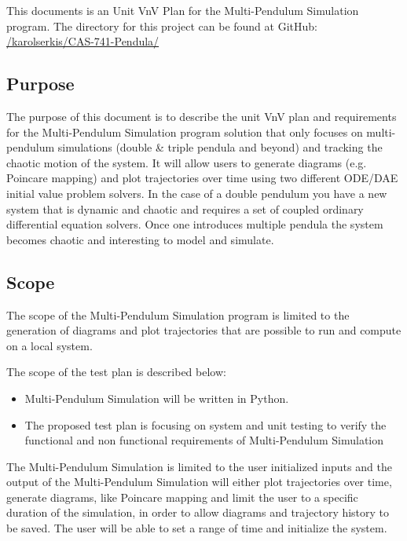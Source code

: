 \documentclass[12pt, titlepage]{article}
\newcommand{\progname}{Multi-Pendulum Simulation }
\begin{document}
This documents is an Unit VnV Plan for the \progname program. The
directory for this project can be found at GitHub:
\href{https://github.com/karolserkis/CAS-741-Pendula/}{/karolserkis/CAS-741-Pendula/}\\

\subsection{Purpose}

The purpose of this document is to describe the unit VnV plan and requirements for the
\progname program solution that
only focuses on multi-pendulum simulations (double \& triple pendula and beyond) and tracking the chaotic
motion of the system. It will allow users to generate diagrams (e.g. Poincare
mapping)
and plot trajectories over time using two different ODE/DAE initial value
problem solvers. In the case of
a double pendulum you have a new system that is dynamic and chaotic and
requires a set of coupled ordinary differential equation solvers. Once one
introduces
multiple
pendula the system becomes chaotic and interesting to model and simulate. 

\subsection{Scope}

The scope of the \progname program is limited to the generation 
of diagrams and plot trajectories that are possible to run and compute on a
local system.

The scope of the test plan is described below:
\begin{itemize}
\item \progname{} will be written in Python.
\item The proposed test plan is focusing on system and unit testing to
  verify the functional and non functional requirements of
  \progname{}
\end{itemize}

The \progname is limited to the user
initialized inputs and the output of the \progname will either plot trajectories over time, generate
diagrams, like Poincare mapping
and limit the user to a specific duration of the simulation, in order to allow
diagrams and trajectory history to be saved.
The user will be able to set a range of time and initialize the system. \\
\end{document}
